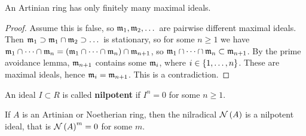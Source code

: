 \begin{lemma}
\label{lem:13.9}
An Artinian ring has only finitely many maximal ideals.
\end{lemma}

\begin{proof}
Assume this is false, so $ \mathfrak{m}_1, \mathfrak{m}_2, \dots $ are pairwise different maximal ideals. Then $ \mathfrak{m}_1 \supset \mathfrak{m}_1 \cap \mathfrak{m}_2 \supset \dots $ is stationary, so for some $ n \ge 1 $ we have $ \mmm_1 \cap \dots \cap \mmm_n = \br{\mmm_1 \cap \dots \cap \mmm_n} \cap \mmm_{n + 1} $, so $ \mathfrak{m}_1 \cap \dots \cap \mathfrak{m}_n \subset \mathfrak{m}_{n + 1} $. By the prime avoidance lemma, $ \mathfrak{m}_{n + 1} $ contains some $ \mathfrak{m}_i $, where $ i \in \cbr{1, \dots, n} $. These are maximal ideals, hence $ \mathfrak{m}_i = \mathfrak{m}_{n + 1} $. This is a contradiction.
\end{proof}

An ideal $ I \subset R $ is called \textbf{nilpotent} if $ I^n = 0 $ for some $ n \ge 1 $.

\begin{lemma}
\label{lem:13.10}
If $ A $ is an Artinian or Noetherian ring, then the nilradical $ \NNN\br{A} $ is a nilpotent ideal, that is $ \NNN\br{A}^m = 0 $ for some $ m $.
\end{lemma}

